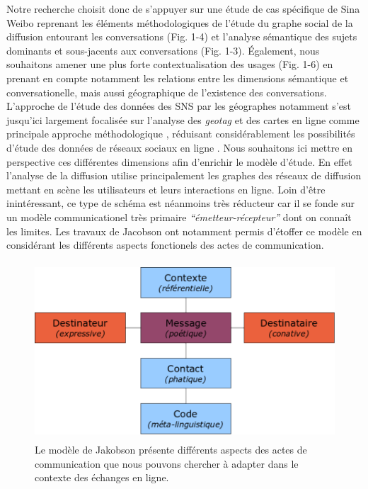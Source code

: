 Notre recherche choisit donc de s{\textquoteright}appuyer sur une
\'etude de cas sp\'ecifique de Sina Weibo reprenant les \'el\'ements
m\'ethodologiques de l{\textquoteright}\'etude du graphe social de la
diffusion entourant les conversations (Fig. 1-4) et
l{\textquoteright}analyse s\'emantique des sujets dominants et
sous-jacents aux conversations (Fig. 1-3). \'Egalement, nous souhaitons
amener une plus forte contextualisation des usages (Fig. 1-6) en
prenant en compte notamment les relations entre les dimensions
s\'emantique et conversationelle, mais aussi g\'eographique de
l{\textquoteright}existence des conversations.
L{\textquoteright}approche de l{\textquoteright}\'etude des donn\'ees
des SNS par les g\'eographes notamment s{\textquoteright}est
jusqu{\textquoteright}ici largement focalis\'ee sur
l{\textquoteright}analyse des \textit{geotag} et des cartes en ligne
comme principale approche m\'ethodologique \citep{Graham2011,
Poorthuis2013}, r\'eduisant consid\'erablement les
possibilit\'es d{\textquoteright}\'etude des donn\'ees de r\'eseaux
sociaux en ligne \citep{Crampton2013}. Nous souhaitons ici mettre en
perspective ces diff\'erentes dimensions afin
d{\textquoteright}enrichir le mod\`ele d{\textquoteright}\'etude. En
effet l{\textquoteright}analyse de la diffusion utilise principalement
les graphes des r\'eseaux de diffusion mettant en sc\`ene les
utilisateurs et leurs interactions en ligne. Loin
d{\textquoteright}\^etre inint\'eressant, ce type de sch\'ema est
n\'eanmoins tr\`es r\'educteur car il se fonde sur un mod\`ele
communicationel tr\`es primaire
\textit{{\textquotedblleft}\'emetteur-r\'ecepteur{\textquotedblright}
}dont on conna\^it les limites. Les travaux de Jacobson ont notamment
permis d{\textquoteright}\'etoffer ce mod\`ele en consid\'erant les
diff\'erents aspects fonctionels des actes de communication.



\begin{figure}
    \centering

    \includegraphics[width=4.6894in,height=2.6114in]{figures/chap3/chapitre3-img5.png}

    \caption[Modèle de Jakobson]{ Le modèle de Jakobson présente différents aspects des actes de communication que nous pouvons chercher \`a adapter dans le contexte des \'echanges en ligne.}

\end{figure}

